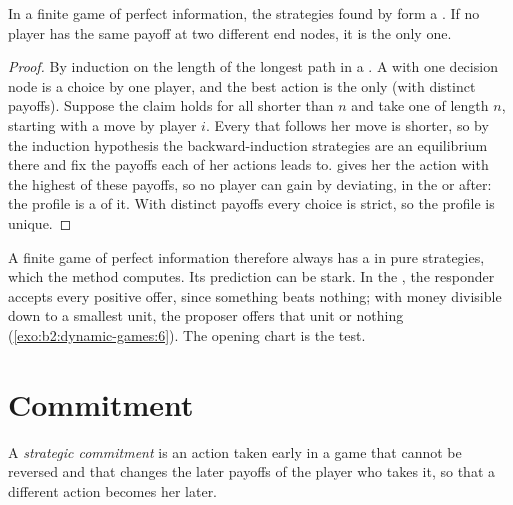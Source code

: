 \begin{proposition}\label{prop:b2:dynamic-games:backward}
In a finite game of perfect information, the strategies found by  form a
. If no player has the same payoff at two different end nodes, it is the only
one.
\end{proposition}

\begin{proof}
By induction on the length of the longest path in a . A  with one decision node is a choice by
one player, and the best action is the only  (with distinct payoffs). Suppose the claim
holds for all  shorter than $n$ and take one of length $n$, starting with a move by player $i$. Every
 that follows her move is shorter, so by the induction hypothesis the backward-induction strategies
are an equilibrium there and fix the payoffs each of her actions leads to.  gives her the
action with the highest of these payoffs, so no player can gain by deviating, in the  or after: the
profile is a  of it. With distinct payoffs every choice is strict, so the profile is unique.
\end{proof}

A finite game of perfect information therefore always has a  in pure
strategies, which the method computes. Its prediction can be stark. In the , the responder
accepts every positive offer, since something beats nothing; with money divisible down to a smallest unit,
the proposer offers that unit or nothing (\cref{exo:b2:dynamic-games:6}). The opening chart is the test.

\section{Commitment}\label{sec:b2:dynamic-games:commitment}

\begin{definition}\label{def:b2:dynamic-games:commitment}
A \emph{strategic commitment} is an action taken early in a game that cannot be
reversed and that changes the later payoffs of the player who takes it, so that a different action becomes
her  later.
\end{definition}

